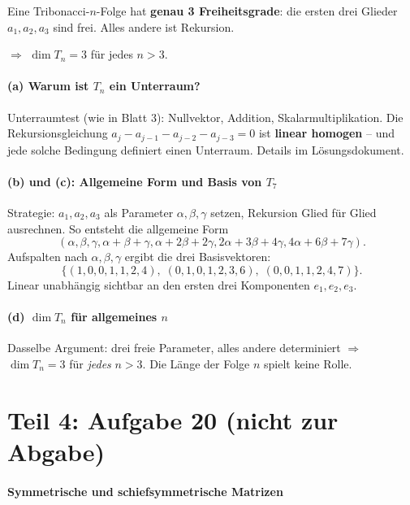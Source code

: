 \documentclass[a4paper,12pt]{article}
\begin{document}
\begin{merkbox}[title={Wichtigste Einsicht}]
Eine Tribonacci-$n$-Folge hat \textbf{genau 3 Freiheitsgrade}: die ersten drei Glieder $a_1, a_2, a_3$ sind frei. Alles andere ist Rekursion.

\medskip
$\Rightarrow$ $\dim T_n = 3$ f\"ur jedes $n > 3$.
\end{merkbox}

\subsection*{(a) Warum ist $T_n$ ein Unterraum?}

Unterraumtest (wie in Blatt 3): Nullvektor, Addition, Skalarmultiplikation. Die Rekursionsgleichung $a_j - a_{j-1} - a_{j-2} - a_{j-3} = 0$ ist \textbf{linear homogen} -- und jede solche Bedingung definiert einen Unterraum. Details im L\"osungsdokument.

\subsection*{(b) und (c): Allgemeine Form und Basis von $T_7$}

Strategie: $a_1, a_2, a_3$ als Parameter $\alpha, \beta, \gamma$ setzen, Rekursion Glied f\"ur Glied ausrechnen. So entsteht die allgemeine Form
\[
(\alpha, \beta, \gamma, \alpha+\beta+\gamma, \alpha+2\beta+2\gamma, 2\alpha+3\beta+4\gamma, 4\alpha+6\beta+7\gamma).
\]
Aufspalten nach $\alpha, \beta, \gamma$ ergibt die drei Basisvektoren:
\[
\{(1,0,0,1,1,2,4),\; (0,1,0,1,2,3,6),\; (0,0,1,1,2,4,7)\}.
\]
Linear unabh\"angig sichtbar an den ersten drei Komponenten $e_1, e_2, e_3$.

\subsection*{(d) $\dim T_n$ f\"ur allgemeines $n$}

Dasselbe Argument: drei freie Parameter, alles andere determiniert $\Rightarrow$ $\dim T_n = 3$ f\"ur \emph{jedes} $n > 3$. Die L\"ange der Folge $n$ spielt keine Rolle.

\newpage

\part*{Teil 4: Aufgabe 20 (nicht zur Abgabe)}

\subsection*{Symmetrische und schiefsymmetrische Matrizen}
\end{document}
